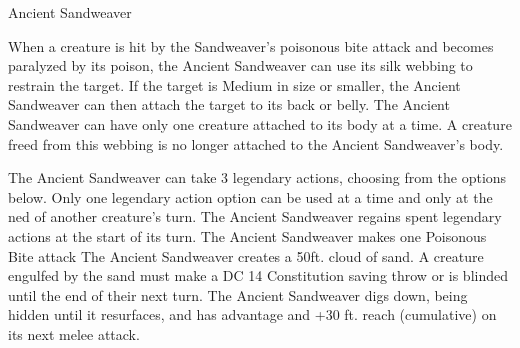\documentclass[10pt,openany,twoside,twocolumn]{book}
\begin{document}
\begin{DndMonster}[float*=b,width=\textwidth +8pt]{Ancient Sandweaver}
\begin{multicols}{2}
    \DndMonsterAttack[
      name=Bash,
      distance=melee, %
      mod=+12,
      reach=35,
      targets=one target,
      dmg={\DndDice{12d12 + 12}},
      dmg-type=bludgeoning,
      extra={. If the targets are creatures, they must succeed on a DC 22 Strength or Dexterity saving throw or be knocked prone},
    ]
      
    \DndMonsterAttack[
      name=Web Shooter (Recharge 5-6),
      distance=ranged, %
      mod=+3,
      reach=20/60,
      targets=5 ft. radius,
      extra={Any target within the radius is restrained by webbing. As an action, the restrained target can make a DC 16 Strength check, bursting the web on a success. The webbing can also be attacked and destroyed (AC 10; HP 7; vulnerability to fire damage; immunity to bludgeoning, poison, and psychic damage)},
    ]
    
    When a creature is hit by the Sandweaver's poisonous bite attack and becomes paralyzed by its poison, the Ancient Sandweaver can use its silk webbing to restrain the target. If the target is Medium in size or smaller, the Ancient Sandweaver can then attach the target to its back or belly. The Ancient Sandweaver  can have only one creature attached to its body at a time. A creature freed from this webbing is no longer attached to the Ancient Sandweaver's body.
    
    The Ancient Sandweaver can take 3 legendary actions, choosing from the options below. Only one legendary action option can be used at a time and only at the ned of another creature's turn. The Ancient Sandweaver regains spent legendary actions at the start of its turn.
    The Ancient Sandweaver makes one Poisonous Bite attack
    The Ancient Sandweaver creates a 50ft. cloud of sand. A creature engulfed by the sand must make a DC 14 Constitution saving throw or is blinded until the end of their next turn.
    The Ancient Sandweaver digs down, being hidden until it resurfaces, and has advantage and +30 ft. reach (cumulative) on its next melee attack.
      
\end{multicols}\end{DndMonster}
\vfill\eject\hfill\vspace*{-0.175em}
\end{document}
